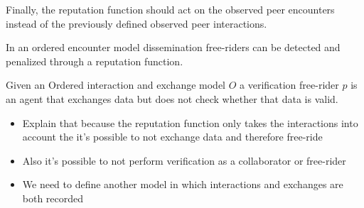 Finally, the reputation function should act on the observed peer encounters instead of the previously
defined observed peer interactions.

\begin{thm}
    In an ordered encounter model dissemination free-riders can be detected and penalized through 
    a reputation function.
\end{thm}

\begin{defn}
    Given an Ordered interaction and exchange model $O$ a verification free-rider $p$ is an agent 
    that exchanges data but does not check whether that data is valid. 
\end{defn}


{\color{red}
\begin{itemize}
    \item Explain that because the reputation function only takes the interactions into account the
    it's possible to not exchange data and therefore free-ride 
    \item Also it's possible to not perform verification as a collaborator or free-rider
    \item We need to define another model in which interactions and exchanges are both recorded
\end{itemize}}